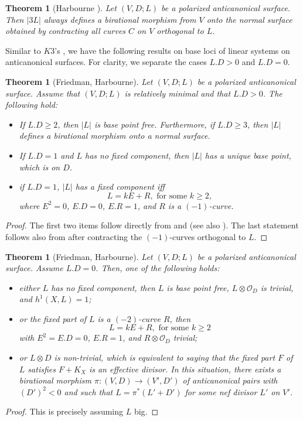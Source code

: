 \documentclass{amsart}
\numberwithin{equation}{section}
\theoremstyle{plain}
\newtheorem{theorem}[equation]{Theorem}
\theoremstyle{remark}
\theoremstyle{definition}
\newcommand{\calO}{\mathcal{O}}
\begin{document}
\begin{theorem}[{Harbourne \cite[Cor. 1.1]{har2}}]
Let $(V,D;L)$ be a polarized anticanonical surface. Then $|3L|$ always defines a birational morphism from $V$ onto the normal surface obtained by contracting all curves $C$ on $V$ orthogonal to $L$.  
\end{theorem}

 




Similar to $K3$'s , we have the following results on base loci of linear systems on anticanonical surfaces.  For clarity, we separate the cases $L.D>0$ and $L.D=0$.


\begin{theorem}[Friedman, Harbourne]\label{thmldn0}
Let $(V,D;L)$ be a polarized anticanonical surface. Assume that $(V,D;L)$ is relatively minimal and that $L.D>0$. The following hold:
\begin{itemize}
\item[i)] If $L.D\ge 2$, then $|L|$ is base point free. Furthermore, if $L.D\ge 3$, then $|L|$ defines a birational morphism onto a normal surface. 
\item[ii)] If $L.D=1$ and $L$ has no fixed component, then $|L|$ has a unique base point, which is on $D$.
\item[iii)] if $L.D=1$, $|L|$ has a fixed component iff 
$$L=kE+R, \textrm{ for some } k\ge 2,$$ 
where $E^2=0$, $E.D=0$, $E.R=1$, and  $R$ is a $(-1)$-curve.
\end{itemize}
\end{theorem}
\begin{proof}
The first two items follow directly from \cite[Thm. III.1 (a,b)]{har1} and \cite[Prop. 3.2]{har2} (see also \cite[Thm. 10]{friedmanlin}). The last statement follows also from \cite[Thm. III.1]{har1} after contracting the $(-1)$-curves orthogonal to $L$.
\end{proof}



\begin{theorem}[Friedman, Harbourne]\label{thmld0}
Let $(V,D;L)$ be a polarized anticanonical surface. Assume $L.D=0$. Then, one of the following holds:
\begin{itemize}
\item[i)] either $L$ has no fixed component, then $L$ is base point free, $L\otimes \calO_D$ is trivial, and $h^1(X,L)=1$;
\item[ii)] or the fixed part of $L$ is a $(-2)$-curve $R$, then 
$$L=kE+R, \textrm{ for some } k\ge 2$$
with $E^2=E.D=0$, $E.R=1$, and $R\otimes \calO_D$ trivial;
\item[iii)] or $L\otimes D$ is non-trivial, which is equivalent to saying that  the fixed part $F$ of $L$ satisfies $F+K_X$ is an effective divisor.  In this situation, there exists a birational morphism $\pi:(V,D)\to (V',D')$ of anticanonical pairs with $(D')^2<0$ and such that $L=\pi^*(L'+D')$ for some nef divisor $L'$ on $V'$. 
\end{itemize}
\end{theorem}
\begin{proof}
This is precisely \cite[Thm. III.1 (c,d)]{har1} assuming  $L$ big. 
\end{proof}
\end{document}
